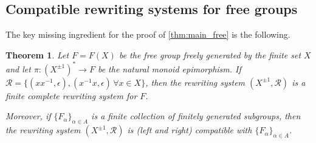\documentclass[12pt, a4paper]{amsart}
\newtheorem{theorem}{Theorem}[section]
\theoremstyle{definition}
\begin{document}
\MainTheoremA*




\subsection{Compatible rewriting systems for free groups}

The key missing ingredient for the proof of \cref{thm:main_free} is the following.

\begin{theorem}
\label{thm:compatible_free}
Let $F = F(X)$ be the free group freely generated by the finite set $X$ and let $\pi\colon (X^{\pm1})^*\to F$ be the natural monoid epimorphism. If $\mathcal{R} = \{(xx^{-1}, \epsilon), (x^{-1}x, \epsilon)\, \forall x\in X\}$, then the rewriting system $(X^{\pm1}, \mathcal{R})$ is a finite complete rewriting system for $F$.

Moreover, if $\{F_{\alpha}\}_{\alpha\in A}$ is a finite collection of finitely generated subgroups, then the rewriting system $(X^{\pm1}, \mathcal{R})$ is (left and right) compatible with $\{F_{\alpha}\}_{\alpha\in A}$.
\end{theorem}
\end{document}

